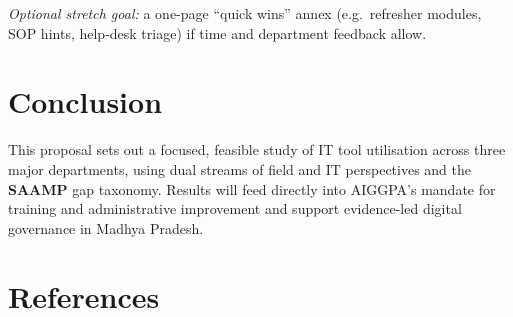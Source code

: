 \documentclass[11pt,a4paper]{article}
\begin{document}
\vspace{0.35cm}
\noindent\small\textit{Optional stretch goal:} a one-page ``quick wins'' annex (e.g.\ refresher modules, SOP hints, help-desk triage) if time and department feedback allow.

\section{Conclusion}

\vspace{0.2cm}
This proposal sets out a focused, feasible study of IT tool utilisation across three major departments, using dual streams of field and IT perspectives and the \textbf{SAAMP} gap taxonomy. Results will feed directly into AIGGPA's mandate for training and administrative improvement and support evidence-led digital governance in Madhya Pradesh.

\section{References}
\end{document}

